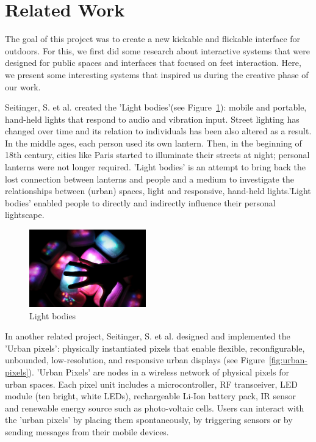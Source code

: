 \section{Related Work}
The goal of this project was to create a new kickable and flickable interface for outdoors. For this, we first did some research about interactive systems that were designed for public spaces and interfaces that focused on feet interaction. Here, we present some interesting systems that inspired us during the creative phase of our work.
 
Seitinger, S. et al. \cite{seitinger} created the 'Light bodies'(see Figure~\ref{fig:Light bodies}): mobile and portable, hand-held lights that respond to audio and vibration input. Street lighting has changed over time and its relation to individuals has been also altered as a result. In the middle ages, each person used its own lantern. Then, in the beginning of 18th century, cities like Paris started to illuminate their streets at night; personal lanterns were not longer required. 'Light bodies' is an attempt to bring back the lost connection between lanterns and people and a medium to investigate the relationships between (urban) spaces, light and responsive, hand-held lights.'Light bodies' enabled people to directly and indirectly influence their personal lightscape.

\begin{figure}[h!]
	\centering
	\includegraphics[width=0.45\textwidth, clip=true, keepaspectratio=true]{./pic/light-bodies.jpg}
	\caption{Light bodies}
	\label{fig:Light bodies}
\end{figure}


In another related project, Seitinger, S. et al. \cite{seitinger-2} designed and implemented the 'Urban pixels': physically instantiated pixels that enable flexible, reconfigurable, unbounded, low-resolution, and responsive urban displays (see Figure~\ref{fig:urban-pixels}). 'Urban Pixels' are nodes in a wireless network of physical pixels for urban spaces. Each pixel unit includes a microcontroller, RF transceiver, LED module (ten bright, white LEDs), rechargeable Li-Ion battery pack, IR sensor and renewable energy source such as photo-voltaic cells. Users can interact with the 'urban pixels' by placing them spontaneously, by triggering sensors or by sending messages from their mobile devices. 

